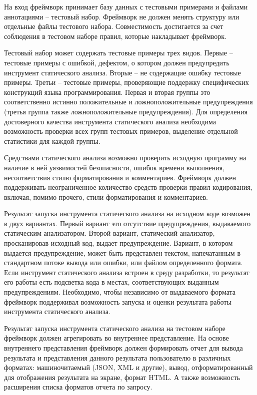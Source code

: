 На вход фреймворк принимает базу данных с тестовыми примерами и файлами аннотациями -- тестовый набор. Фреймворк не должен менять структуру или отдельные файлы тестового набора.
Совместимость достигается за счет соблюдения в тестовом наборе правил, которые
накладывает фреймворк.

Тестовый набор может содержать тестовые примеры трех видов. Первые –
тестовые примеры с ошибкой, дефектом, о котором должен предупредить инструмент статического анализа. 
Вторые – не содержащие ошибку тестовые примеры. 
Третьи – тестовые примеры, проверяющие поддержку специфических конструкций языка программирования. 
Первая и вторая группы это соответственно истинно положительные и ложноположительные предупреждения
(третья группа также ложноположительные предупреждения). Для определения
достоверного качества инструмента статического анализа необходима возможность проверки всех групп тестовых примеров, выделение отдельной статистики
для каждой группы.

Средствами статического анализа возможно проверить исходную программу на наличие в ней уязвимостей безопасности, ошибок времени выполнения,
несоответствия стилю форматирования и комментариев. Фреймворк должен поддерживать неограниченное количество средств проверки правил кодирования,
включая, помимо прочего, стили форматирования и комментариев.

Результат запуска инструмента статического анализа на исходном коде возможен в двух вариантах. Первый вариант это отсутствие предупреждения, выдаваемого статическим анализатором. Второй вариант, статический анализатор, просканировав исходный код, выдает предупреждение. Вариант, в котором выдается
предупреждение, может быть представлен текстом, напечатанным в стандартном потоке вывода или ошибки, или файлом определенного формата. Если инструмент статического анализа встроен в среду разработки, то результат его работы есть подсветка кода
в местах, соответствующих выданным предупреждениям. Необходимо, чтобы
независимо от выдаваемого формата фреймворк поддерживал возможность запуска и оценки результата работы инструмента статического анализа.

Результат запуска инструмента статического анализа на тестовом наборе фреймворк должен
агрегировать во внутреннее представление. На основе внутреннего представления фреймворк должен формировать отчет для вывода результата и представления данного результата пользователю в различных форматах: машиночитаемый
(JSON, XML и другие), вывод, отформатированный для отображения результата на экране, формат HTML. А также возможность расширения списка форматов
отчета по запросу.

